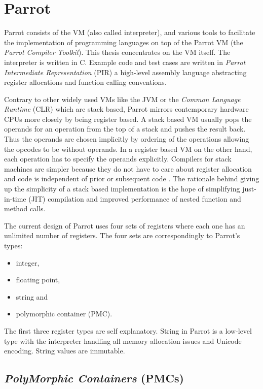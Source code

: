 \documentclass[bachelor,english]{hgbthesis}
\begin{document}
\chapter{Parrot}

Parrot consists of the VM (also called interpreter), and various tools to facilitate the implementation of programming languages on top of the Parrot VM (the \textit{Parrot Compiler Toolkit}). This thesis concentrates on the VM itself. The interpreter is written in C. Example code and test cases are written in \textit{Parrot Intermediate Representation} (PIR) a high-level assembly language abstracting register allocations and function calling conventions.

Contrary to other widely used VMs like the JVM or the \textit{Common Language Runtime} (CLR) which are stack based, Parrot mirrors contemporary hardware CPUs more closely by being register based. A stack based VM usually pops the operands for an operation from the top of a stack and pushes the result back. Thus the operands are chosen implicitly by ordering of the operations allowing the opcodes to be without operands. In a register based VM on the other hand, each operation has to specify the operands explicitly. Compilers for stack machines are simpler because they do not have to care about register allocation and code is independent of prior or subsequent code \cite{VMShowdown}. The rationale behind giving up the simplicity of a stack based implementation is the hope of simplifying just-in-time (JIT) compilation and improved performance of nested function and method calls.

The current design of Parrot uses four sets of registers where each one has an unlimited number of registers. The four sets are correspondingly to Parrot's types:
%
\begin{itemize}
\item integer,
\item floating point,
\item string and
\item polymorphic container (PMC).
\end{itemize}

The first three register types are self explanatory. String in Parrot is a low-level type with the interpreter handling all memory allocation issues and Unicode encoding. String values are immutable.

\section{\textit{PolyMorphic Containers} (PMCs)}
\label{sec:PMCs}
\end{document}
